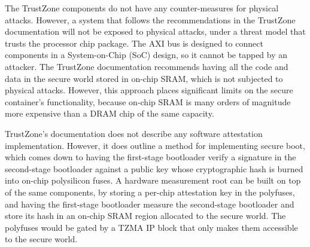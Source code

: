 The TrustZone components do not have any counter-measures for physical attacks.
However, a system that follows the recommendations in the TrustZone
documentation will not be exposed to physical attacks, under a threat model
that trusts the processor chip package. The AXI bus is designed to connect
components in a System-on-Chip (SoC) design, so it cannot be tapped by an
attacker. The TrustZone documentation recommends having all the code and data
in the secure world stored in on-chip SRAM, which is not subjected to physical
attacks. However, this approach places significant limits on the secure
container's functionality, because on-chip SRAM is many orders of magnitude
more expensive than a DRAM chip of the same capacity.

TrustZone's documentation does not describe any software attestation
implementation. However, it does outline a method for implementing secure boot,
which comes down to having the first-stage bootloader verify a signature in
the second-stage bootloader against a public key whose cryptographic hash is
burned into on-chip polysilicon fuses. A hardware measurement root can be built
on top of the same components, by storing a per-chip attestation key in the
polyfuses, and having the first-stage bootloader measure the second-stage
bootloader and store its hash in an on-chip SRAM region allocated to the secure
world. The polyfuses would be gated by a TZMA IP block that only makes them
accessible to the secure world.
